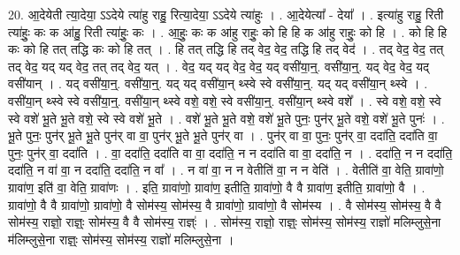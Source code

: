 \documentclass[17pt]{extarticle}
\begin{document}
20. आ॒देयेती त्या॒देया॒ ऽऽदेये त्या॑हु राहु॒ रित्या॒देया॒ ऽऽदेये त्या॑हुः । . आ॒देयेत्या᳚ - देया᳚ । . इत्या॑हु राहु॒ रिती त्या॑हुः॒ कः क आ॑हु॒ रिती त्या॑हुः॒ कः । . आ॒हुः॒ कः क आ॑हु राहुः॒ को हि हि क आ॑हु राहुः॒ को हि । . को हि हि कः को हि तत् तद्धि कः को हि तत् । . हि तत् तद्धि हि तद् वेद॒ वेद॒ तद्धि हि तद् वेद॑ । . तद् वेद॒ वेद॒ तत् तद् वेद॒ यद् यद् वेद॒ तत् तद् वेद॒ यत् । . वेद॒ यद् यद् वेद॒ वेद॒ यद् वसी॑या॒न्॒. वसी॑या॒न्॒. यद् वेद॒ वेद॒ यद् वसी॑यान् । . यद् वसी॑या॒न्॒. वसी॑या॒न्॒. यद् यद् वसी॑या॒न् थ्स्वे स्वे वसी॑या॒न्॒. यद् यद् वसी॑या॒न् थ्स्वे । . वसी॑या॒न् थ्स्वे स्वे वसी॑या॒न्॒. वसी॑या॒न् थ्स्वे वशे॒ वशे॒ स्वे वसी॑या॒न्॒. वसी॑या॒न् थ्स्वे वशे᳚ । . स्वे वशे॒ वशे॒ स्वे स्वे वशे॑ भू॒ते भू॒ते वशे॒ स्वे स्वे वशे॑ भू॒ते । . वशे॑ भू॒ते भू॒ते वशे॒ वशे॑ भू॒ते पुनः॒ पुन॑र् भू॒ते वशे॒ वशे॑ भू॒ते पुनः॑ । . भू॒ते पुनः॒ पुन॑र् भू॒ते भू॒ते पुन॑र् वा वा॒ पुन॑र् भू॒ते भू॒ते पुन॑र् वा । . पुन॑र् वा वा॒ पुनः॒ पुन॑र् वा॒ ददा॑ति॒ ददा॑ति वा॒ पुनः॒ पुन॑र् वा॒ ददा॑ति । . वा॒ ददा॑ति॒ ददा॑ति वा वा॒ ददा॑ति॒ न न ददा॑ति वा वा॒ ददा॑ति॒ न । . ददा॑ति॒ न न ददा॑ति॒ ददा॑ति॒ न वा॑ वा॒ न ददा॑ति॒ ददा॑ति॒ न वा᳚ । . न वा॑ वा॒ न न वेतीति॑ वा॒ न न वेति॑ । . वेतीति॑ वा॒ वेति॒ ग्रावा॑णो॒ ग्रावा॑ण॒ इति॑ वा॒ वेति॒ ग्रावा॑णः । . इति॒ ग्रावा॑णो॒ ग्रावा॑ण॒ इतीति॒ ग्रावा॑णो॒ वै वै ग्रावा॑ण॒ इतीति॒ ग्रावा॑णो॒ वै । . ग्रावा॑णो॒ वै वै ग्रावा॑णो॒ ग्रावा॑णो॒ वै सोम॑स्य॒ सोम॑स्य॒ वै ग्रावा॑णो॒ ग्रावा॑णो॒ वै सोम॑स्य । . वै सोम॑स्य॒ सोम॑स्य॒ वै वै सोम॑स्य॒ राज्ञो॒ राज्ञ्ः॒ सोम॑स्य॒ वै वै सोम॑स्य॒ राज्ञ्ः॑ । . सोम॑स्य॒ राज्ञो॒ राज्ञ्ः॒ सोम॑स्य॒ सोम॑स्य॒ राज्ञो॑ मलिम्लुसे॒ना म॑लिम्लुसे॒ना राज्ञ्ः॒ सोम॑स्य॒ सोम॑स्य॒ राज्ञो॑ मलिम्लुसे॒ना । \newline
\end{document}
